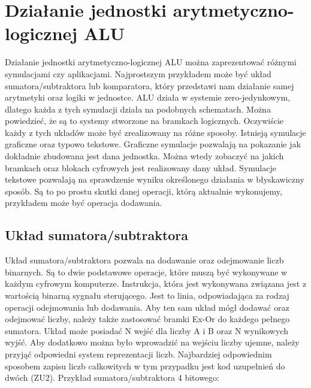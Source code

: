 \documentclass[12pt, a4paper, onside, polish]{article}				%
\begin{document}
\cleardoublepage





\section{Działanie jednostki arytmetyczno-logicznej ALU}
\hspace{\parindent}
Działanie jednostki arytmetyczno-logicznej ALU można zaprezentować różnymi symulacjami czy aplikacjami. Najprostszym przykładem może być układ sumatora/subtraktora lub komparatora, który przedstawi nam działanie samej arytmetyki oraz logiki w jednostce. ALU działa w systemie zero-jedynkowym, dlatego każda z tych symulacji działa na podobnych schematach. Można powiedzieć, że są to systemy stworzone na bramkach logicznych. Oczywiście każdy z tych układów może być zrealizowany na różne sposoby. Istnieją symulacje graficzne oraz typowo tekstowe. 
	 Graficzne symulacje pozwalają na pokazanie jak dokładnie zbudowana jest dana jednostka. Można wtedy zobaczyć na jakich bramkach oraz blokach cyfrowych jest realizowany dany układ.  
	Symulacje tekstowe pozwalają na sprawdzenie wyniku określonego działania w błyskawiczny sposób. Są to po prostu skutki danej operacji, którą aktualnie wykonujemy, przykładem może być operacja dodawania.  
	
\cleardoublepage

\subsection{Układ sumatora/subtraktora}
\hspace{\parindent}
Układ sumatora/subtraktora pozwala na dodawanie oraz odejmowanie liczb binarnych. Są to dwie podstawowe operacje, które muszą być wykonywane w każdym cyfrowym komputerze. Instrukcja, która jest wykonywana związana jest z wartością binarną sygnału sterującego. Jest to linia, odpowiadająca za rodzaj operacji odejmowania lub dodawania. Aby ten sam układ mógł dodawać oraz odejmować liczby, należy także zastosować bramki Ex-Or do każdego pełnego sumatora. Układ może posiadać N wejść dla liczby A i B oraz N wynikowych wyjść. Aby dodatkowo można było wprowadzić na wejściu liczby ujemne, należy przyjąć odpowiedni system reprezentacji liczb. Najbardziej odpowiednim sposobem zapisu liczb całkowitych w tym przypadku jest kod uzupełnień do dwóch (ZU2).  \newline\newline
Przykład sumatora/subtraktora 4 bitowego:
\end{document}
